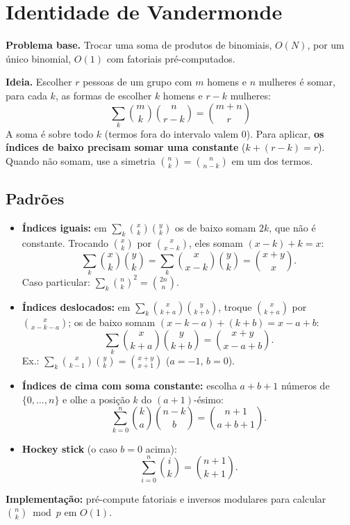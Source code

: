 \section{Identidade de Vandermonde}

\textbf{Problema base.} Trocar uma soma de produtos de binomiais, $O(N)$, por um único binomial, $O(1)$
com fatoriais pré-computados.

\textbf{Ideia.} Escolher $r$ pessoas de um grupo com $m$ homens e $n$ mulheres é somar, para cada $k$,
as formas de escolher $k$ homens e $r - k$ mulheres:
\[
\boxed{\sum_{k} \binom{m}{k}\binom{n}{r-k} = \binom{m+n}{r}}
\]
A soma é sobre todo $k$ (termos fora do intervalo valem $0$). Para aplicar, \textbf{os índices de baixo precisam somar
uma constante} ($k + (r - k) = r$). Quando não somam, use a simetria $\binom{n}{k} = \binom{n}{n-k}$ em um dos termos.

\subsection*{Padrões}

\begin{itemize}
  \item \textbf{Índices iguais:} em $\sum_k \binom{x}{k}\binom{y}{k}$ os de baixo somam $2k$, que não é constante. Trocando
        $\binom{x}{k}$ por $\binom{x}{x-k}$, eles somam $(x - k) + k = x$:
        \[ \sum_{k} \binom{x}{k}\binom{y}{k} = \sum_{k} \binom{x}{x-k}\binom{y}{k} = \binom{x+y}{x}. \]
        Caso particular: $\sum_{k} \binom{n}{k}^2 = \binom{2n}{n}$.

  \item \textbf{Índices deslocados:} em $\sum_k \binom{x}{k+a}\binom{y}{k+b}$, troque $\binom{x}{k+a}$ por $\binom{x}{x-k-a}$;
        os de baixo somam $(x - k - a) + (k + b) = x - a + b$:
        \[ \sum_{k} \binom{x}{k+a}\binom{y}{k+b} = \binom{x+y}{x-a+b}. \]
        Ex.: $\sum_{k} \binom{x}{k-1}\binom{y}{k} = \binom{x+y}{x+1}$ \;($a = -1$, $b = 0$).

  \item \textbf{Índices de cima com soma constante:} escolha $a + b + 1$ números de $\{0, \dots, n\}$ e
        olhe a posição $k$ do $(a+1)$-ésimo:
        \[ \sum_{k=0}^{n} \binom{k}{a}\binom{n-k}{b} = \binom{n+1}{a+b+1}. \]

  \item \textbf{Hockey stick} (o caso $b = 0$ acima):
        \[ \sum_{i=0}^{n} \binom{i}{k} = \binom{n+1}{k+1}. \]
\end{itemize}

\textbf{Implementação:} pré-compute fatoriais e inversos modulares para calcular $\binom{n}{k} \bmod p$ em $O(1)$.
